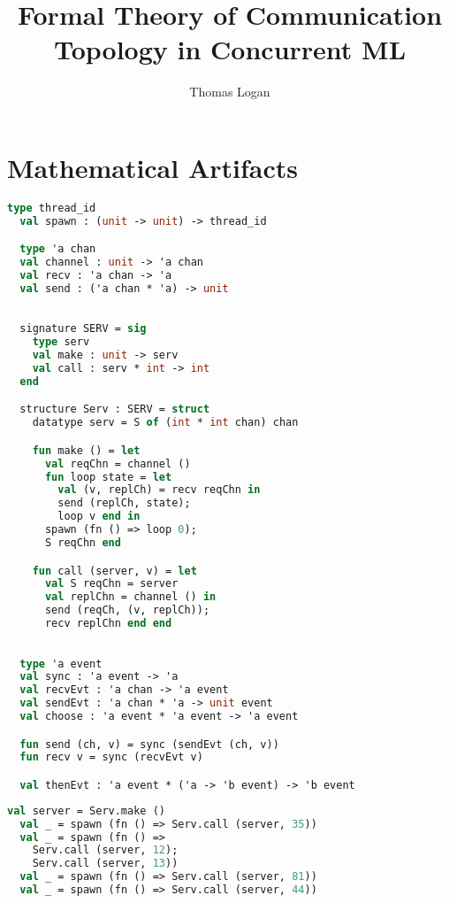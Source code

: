 \documentclass{article}
\title{Formal Theory of Communication Topology in Concurrent ML}
\author{Thomas Logan}
\begin{document}
\maketitle
{}

\newpage
{}

\section{Mathematical Artifacts}

\begin{lstlisting}[language=ML, style=codestyle1]
  type thread_id
  val spawn : (unit -> unit) -> thread_id

  type 'a chan
  val channel : unit -> 'a chan
  val recv : 'a chan -> 'a
  val send : ('a chan * 'a) -> unit
  \end{lstlisting}

\begin{lstlisting}[language=ML, style=codestyle1]

  signature SERV = sig 
    type serv
    val make : unit -> serv
    val call : serv * int -> int
  end

  structure Serv : SERV = struct 
    datatype serv = S of (int * int chan) chan 

    fun make () = let 
      val reqChn = channel ()
      fun loop state = let
        val (v, replCh) = recv reqChn in 
        send (replCh, state);
        loop v end in
      spawn (fn () => loop 0);
      S reqChn end 

    fun call (server, v) = let 
      val S reqChn = server
      val replChn = channel () in 
      send (reqCh, (v, replCh));
      recv replChn end end

  \end{lstlisting}

\begin{lstlisting}[language=ML, style=codestyle1]

  type 'a event
  val sync : 'a event -> 'a
  val recvEvt : 'a chan -> 'a event
  val sendEvt : 'a chan * 'a -> unit event
  val choose : 'a event * 'a event -> 'a event

  fun send (ch, v) = sync (sendEvt (ch, v))
  fun recv v = sync (recvEvt v)

  val thenEvt : 'a event * ('a -> 'b event) -> 'b event

  \end{lstlisting}

\begin{lstlisting}[language=ML, style=codestyle1]
  val server = Serv.make ()
  val _ = spawn (fn () => Serv.call (server, 35))
  val _ = spawn (fn () => 
    Serv.call (server, 12); 
    Serv.call (server, 13))
  val _ = spawn (fn () => Serv.call (server, 81))
  val _ = spawn (fn () => Serv.call (server, 44))
  \end{lstlisting}
\end{document}

